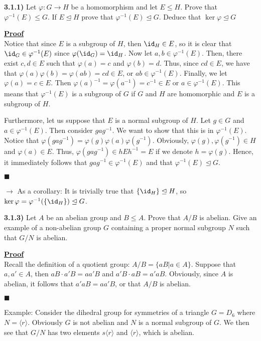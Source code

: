 \documentclass[12pt,a4paper]{article}
\newcommand{\prob}[2]{\textbf{#1)} #2}
\newenvironment{proof}
{
\textbf{\underline{Proof}} \\
}
{
\begin{flushright}
$\blacksquare$
\end{flushright}}
\begin{document}
\prob{3.1.1}{Let $\varphi: G \rightarrow H$ be a homomorphism and let $E \leq H$. Prove that $\varphi^{-1}(E) \leq G$. If $E \trianglelefteq H$ prove that $\varphi^{-1}(E) \trianglelefteq G$. Deduce that $\ker{\varphi} \trianglelefteq G$}

\begin{proof}
Notice that since $E$ is a subgroup of $H$, then $\id_H \in E$, so it is clear that $\id_G \in \varphi^{-1}(E)$ since $\varphi(\id_G) = \id_H$. Now let $a,b \in \varphi^{-1}(E)$. Then, there exist $c,d \in E$ such that $\varphi(a) = c$ and $\varphi(b) = d$. Thus, since $cd \in E$, we have that $\varphi(a)\varphi(b) = \varphi(ab) = cd \in E$, or $ab \in \varphi^{-1}(E)$. Finally, we let $\varphi(a) = c \in E$. Then $\varphi(a)^{-1} = \varphi(a^{-1}) = c^{-1} \in E$ or $a \in \varphi^{-1}(E)$. This means that $\varphi^{-1}(E)$ is a subgroup of $G$ if $G$ and $H$ are homomorphic and $E$ is a subgroup of $H$. 

Furthermore, let us suppose that $E$ is a normal subgroup of $H$. Let $g \in G$ and $a \in \varphi^{-1}(E)$. Then consider $gag^{-1}$. We want to show that this is in $\varphi^{-1}(E)$. Notice that $\varphi(gag^{-1}) = \varphi(g)\varphi(a)\varphi(g^{-1})$. Obviously, $\varphi(g),\varphi(g^{-1}) \in H$ and $\varphi(a) \in E$. Thus, $\varphi(gag^{-1}) \in hEh^{-1} = E$ if we denote $h = \varphi(g)$. Hence, it immediately follows that $gag^{-1} \in \varphi^{-1}(E)$ and that $\varphi^{-1}(E) \trianglelefteq G$.
\end{proof}

$\rightarrow$ As a corollary: It is trivially true that $\{\id_H\} \trianglelefteq H$, so $\ker{\varphi} = \varphi^{-1}(\{\id_H\}) \trianglelefteq G$.

\prob{3.1.3}{Let $A$ be an abelian group and $B \leq A$. Prove that $A/B$ is abelian. Give an example of a non-abelian group $G$ containing a proper normal subgroup $N$ such that $G/N$ is abelian.}

\begin{proof}
Recall the definition of a quotient group: $A/B = \{aB | a \in A \}$. Suppose that $a,a' \in A$, then $aB \cdot a'B = aa'B$ and $a'B \cdot aB = a'aB$. Obviously, since $A$ is abelian, it follows that $a'aB = aa'B$, or that $A/B$ is abelian.
\end{proof}

Example: Consider the dihedral group for symmetries of a triangle $G = D_6$ where $N = \langle r \rangle$. Obviously $G$ is not abelian and $N$ is a normal subgroup of $G$. We then see that $G/N$ has two elements $s\langle r \rangle$ and $\langle r \rangle$, which is abelian.
\end{document}
